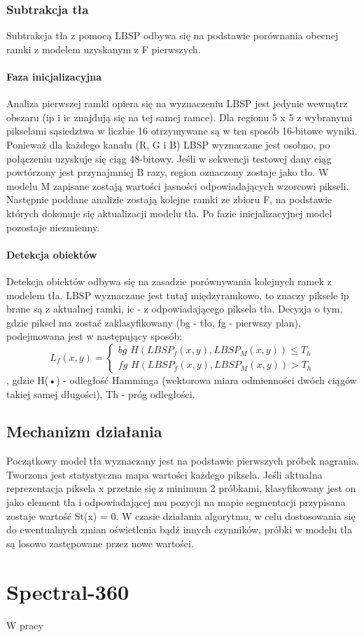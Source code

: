 \subsubsection{Subtrakcja tła}
Subtrakcja tła z pomocą LBSP odbywa się na podstawie porównania obecnej ramki z modelem uzyskanym z F pierwszych. 
\paragraph{Faza inicjalizacyjna \\}
Analiza pierwszej ramki opiera się na wyznaczeniu LBSP  jest jedynie wewnątrz obszaru (ip i ic znajdują się na tej samej ramce). Dla regionu 5 x 5 z wybranymi pikselami sąsiedztwa w liczbie 16 otrzymywane są w ten sposób 16-bitowe wyniki. Ponieważ dla każdego kanału (R, G i B) LBSP wyznaczane jest osobno, po połączeniu uzyskuje się ciąg 48-bitowy. Jeśli w sekwencji testowej dany ciąg powtórzony jest przynajmniej B razy, region oznaczony zostaje jako tło. W modelu M zapisane zostają wartości jasności odpowiadających wzorcowi pikseli. Następnie poddane analizie zostają kolejne ramki ze zbioru F, na podstawie których dokonuje się aktualizacji modelu tła. Po fazie inicjalizacyjnej model pozostaje niezmienny.
\paragraph{Detekcja obiektów \\}
Detekcja obiektów odbywa się na zasadzie porównywania kolejnych ramek z modelem tła. LBSP wyznaczane jest tutaj międzyramkowo, to znaczy piksele ip brane są z aktualnej ramki, ic - z odpowiadającego piksela tła. Decyzja o tym, gdzie piksel ma zostać zaklasyfikowany (bg - tło, fg - pierwszy plan), podejmowana jest w następujący sposób:
\begin{equation}
L_{f}(x,y)=\left\{\substack{
bg \, \, H(LBSP_{f}(x,y),LBSP_{M}(x,y))\leq T_{h} \\[0.5em]
fg \, \, H(LBSP_{f}(x,y),LBSP_{M}(x,y))>T_{h}}\right.
\end{equation}
, gdzie H(•) - odległość Hamminga (wektorowa miara odmienności dwóch ciągów takiej samej długości), Th - próg odległości.
\subsection{Mechanizm działania}
Początkowy model tła wyznaczany jest na podstawie pierwszych próbek nagrania. Tworzona jest statystyczna mapa wartości każdego piksela. Jeśli aktualna reprezentacja piksela x przetnie się z minimum 2 próbkami, klasyfikowany jest on jako element tła i odpowiadającej mu pozycji na mapie segmentacji przypisana zostaje wartość St(x) = 0. W czasie działania algorytmu, w celu dostosowania się do ewentualnych zmian oświetlenia bądź innych czynników, próbki w modelu tła są losowo zastępowane przez nowe wartości.
\section{Spectral-360}
W pracy \cite{6910013}



